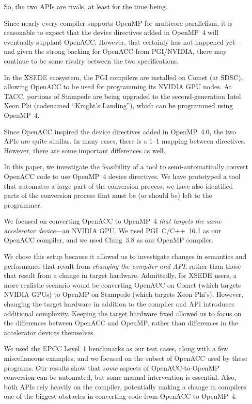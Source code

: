 \documentclass{sig-alternate-05-2015}
\begin{document}
So, the two APIs are rivals, at least for the time being.

Since nearly every compiler supports OpenMP for multicore parallelism, it is
reasonable to expect that the device directives added in OpenMP~4 will
eventually supplant OpenACC\@.  However, that certainly has not happened
yet---and given the strong backing for OpenACC from PGI/NVIDIA, there may
continue to be some rivalry between the two specifications.

In the XSEDE ecosystem, the PGI compilers are installed on Comet (at SDSC),
allowing OpenACC to be used for programming its NVIDIA GPU nodes.  At TACC,
portions of Stampede are being upgraded to the second-generation Intel Xeon Phi
(codenamed ``Knight's Landing''), which can be programmed using OpenMP~4.

Since OpenACC inspired the device directives added in OpenMP~4.0, the two APIs
are quite similar.  In many cases, there is a 1--1 mapping between directives.
However, there are some important differences as well.

In this paper, we investigate the feasibility of a tool to semi-automatically
convert OpenACC code to use OpenMP~4 device directives.  We have prototyped a
tool that automates a large part of the conversion process; we have also
identified parts of the conversion process that must be (or should be) left to
the programmer.

We focused on converting OpenACC to OpenMP~4 \emph{that targets the same
accelerator device}---an NVIDIA GPU.  We used PGI~C/C++~16.1 as our OpenACC
compiler, and we used Clang~3.8 as our OpenMP compiler.

We chose this setup because it allowed us to investigate changes in semantics
and performance that result from \emph{changing the compiler and API}, rather
than those that result from a change in target hardware.  Admittedly, for XSEDE
users, a more realistic scenario would be converting OpenACC on Comet (which
targets NVIDIA GPUs) to OpenMP on Stampede (which targets Xeon Phi's).
However, changing the target hardware in addition to the compiler and API
introduces additional complexity.  Keeping the target hardware fixed allowed us
to focus on the differences between OpenACC and OpenMP, rather than differences
in the accelerator devices themselves.

We used the EPCC Level~1 benchmarks as our test cases, along with a few
miscellaneous examples, and we focused on the subset of OpenACC used by these
programs.  Our results show that \emph{some} aspects of OpenACC-to-OpenMP
conversion can be automated, but some manual intervention is essential.
Also, both APIs rely heavily on the compiler, potentially making a change in
compilers one of the biggest obstacles in converting code from OpenACC to
OpenMP~4.
\end{document}
